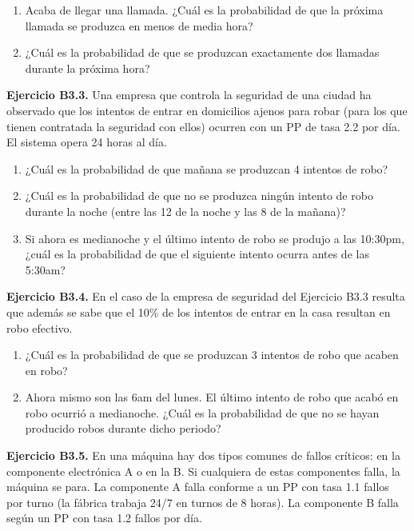 \documentclass[
]{book}
\providecommand{\tightlist}{%
  \setlength{\itemsep}{0pt}\setlength{\parskip}{0pt}}
\theoremstyle{definition}
\theoremstyle{definition}
\theoremstyle{definition}
\theoremstyle{definition}
\theoremstyle{remark}
\begin{document}
\begin{enumerate}
\def\labelenumi{\arabic{enumi}.}
\tightlist
\item
  Acaba de llegar una llamada. ¿Cuál es la probabilidad de que la próxima llamada se produzca en menos de media hora?
\item
  ¿Cuál es la probabilidad de que se produzcan exactamente dos llamadas durante la próxima hora?
\end{enumerate}

\textbf{Ejercicio B3.3.} Una empresa que controla la seguridad de una ciudad ha observado que los intentos de entrar en domicilios ajenos para robar (para los que tienen contratada la seguridad con ellos) ocurren con un PP de tasa 2.2 por día. El sistema opera 24 horas al día.

\begin{enumerate}
\def\labelenumi{\arabic{enumi}.}
\tightlist
\item
  ¿Cuál es la probabilidad de que mañana se produzcan 4 intentos de robo?
\item
  ¿Cuál es la probabilidad de que no se produzca ningún intento de robo durante la noche (entre las 12 de la noche y las 8 de la mañana)?
\item
  Si ahora es medianoche y el último intento de robo se produjo a las 10:30pm, ¿cuál es la probabilidad de que el siguiente intento ocurra antes de las 5:30am?
\end{enumerate}

\textbf{Ejercicio B3.4.} En el caso de la empresa de seguridad del Ejercicio B3.3 resulta que además se sabe que el 10\% de los intentos de entrar en la casa resultan en robo efectivo.

\begin{enumerate}
\def\labelenumi{\arabic{enumi}.}
\tightlist
\item
  ¿Cuál es la probabilidad de que se produzcan 3 intentos de robo que acaben en robo?
\item
  Ahora mismo son las 6am del lunes. El último intento de robo que acabó en robo ocurrió a medianoche. ¿Cuál es la probabilidad de que no se hayan producido robos durante dicho periodo?
\end{enumerate}

\textbf{Ejercicio B3.5.} En una máquina hay dos tipos comunes de fallos críticos: en la componente electrónica A o en la B. Si cualquiera de estas componentes falla, la máquina se para. La componente A falla conforme a un PP con tasa 1.1 fallos por turno (la fábrica trabaja 24/7 en turnos de 8 horas). La componente B falla según un PP con tasa 1.2 fallos por día.
\end{document}
